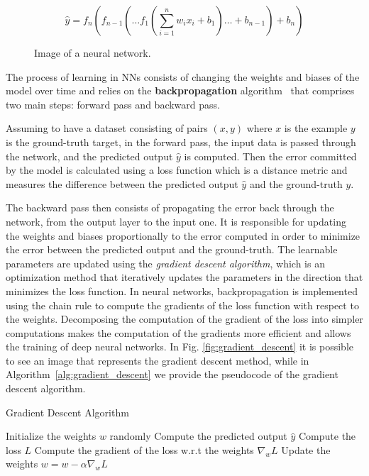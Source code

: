 \begin{equation}
    \hat{y} = f_n(f_{n-1}(\dots f_1(\sum_{i=1}^{n} w_i x_i + b_1) \dots + b_{n-1}) + b_n)
    \label{eq:nn}
\end{equation}


\begin{figure}[ht]
    \begin{center}
        \fbox{\rule[-.5cm]{0cm}{4cm} \rule[-.5cm]{4cm}{0cm}}
    \end{center}
    \caption{Image of a neural network.}
    \label{fig:nn}
\end{figure}


The process of learning in NNs consists of changing the weights and biases of the model over time and relies on the \textbf{backpropagation} algorithm~\citep{rumelhart1986learning} that comprises two main steps: forward pass and backward pass.

Assuming to have a dataset consisting of pairs $(x,y)$ where
$x$ is the example $y$ is the ground-truth target, in the forward pass, the input data is passed through the network, and the predicted output $\hat{y}$ is computed.
Then the error committed by the model is calculated using a loss function which is a distance metric and measures the difference between the predicted output $\hat{y}$ and the ground-truth $y$.

The backward pass then consists of propagating the error back through the network, from the output layer to the input one. 
It is responsible for updating the weights and biases proportionally to the error computed in order to minimize the error between the predicted output and the ground-truth.
The learnable parameters are updated using the \textit{gradient descent algorithm}, which is an optimization method that iteratively updates the parameters in the direction that minimizes the loss function.
In neural networks, backpropagation is implemented using the chain rule to compute the gradients of the loss function with respect to the weights. 
Decomposing the computation of the gradient of the loss into simpler computations makes the computation of the gradients more efficient and allows the training of deep neural networks.
In Fig. \ref{fig:gradient_descent} it is possible to see an image that represents the gradient descent method, while in Algorithm~\ref{alg:gradient_descent} we provide the pseudocode of the gradient descent algorithm.

\begin{algorithm}
\caption{Gradient Descent Algorithm}\label{alg:gradient_descent}
\begin{algorithmic}
    \State Initialize the weights $w$ randomly
        \State Compute the predicted output $\hat{y}$
        \State Compute the loss $L$
        \State Compute the gradient of the loss w.r.t the weights $\nabla_w L$
        \State Update the weights $w = w - \alpha \nabla_w L$
    \EndWhile
\end{algorithmic}
\end{algorithm}





